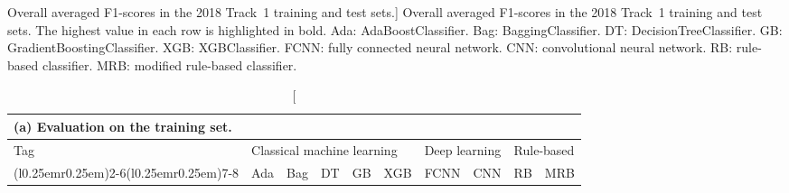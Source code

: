 \begingroup

\setlength\tabcolsep{5.45pt}

\newcommand{\minorfootnotesize}{\fontsize{9.5pt}{11.4pt}\selectfont}

\begin{table}[!t]

\caption%
[Overall averaged F1-scores in the 2018  Track~1 training and test sets.]%
{\small%
Overall averaged F1-scores in the 2018  Track~1 training and test sets. The highest value in each row is highlighted in bold. Ada: \textsf{AdaBoostClassifier}. Bag: \textsf{BaggingClassifier}. DT: \textsf{DecisionTreeClassifier}. GB: \textsf{GradientBoostingClassifier}. XGB: \textsf{XGBClassifier}. FCNN: fully connected neural network. CNN: convolutional neural network. RB: rule-based classifier. MRB: modified rule-based classifier.}
\label{tab:2018-n2c2-results-all}

\centering

\minorfootnotesize

\begin{tabular}{lrrrrrrrrr}

\multicolumn{10}{l}{\small (a) Evaluation on the training set.}\\[4pt]

\toprule

Tag & \multicolumn{5}{l}{Classical machine learning} & \multicolumn{2}{l}{Deep learning} & \multicolumn{2}{l}{Rule-based}\\

\cmidrule(r{0.25em}){1-1}\cmidrule(l{0.25em}r{0.25em}){2-6}\cmidrule(l{0.25em}r{0.25em}){7-8}\cmidrule(l{0.25em}){9-10}

& Ada & Bag & DT & GB & XGB & FCNN & CNN & RB & MRB\\


\end{tabular}
\end{table}
